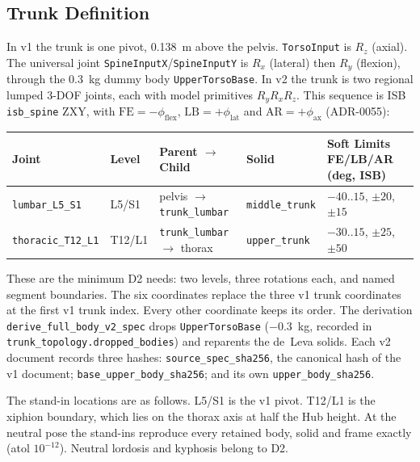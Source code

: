 \documentclass[11pt,a4paper]{article}
\begin{document}
\subsection{Trunk Definition}
In v1 the trunk is one pivot, 0.138~m above the pelvis.
\texttt{TorsoInput} is $R_z$ (axial). The universal joint
\texttt{SpineInputX}/\texttt{SpineInputY} is $R_x$ (lateral) then $R_y$
(flexion), through the 0.3~kg dummy body \texttt{UpperTorsoBase}. In v2 the
trunk is two regional lumped 3-DOF joints, each with model primitives
$R_y R_x R_z$. This sequence is ISB \texttt{isb\_spine} ZXY, with
$\mathrm{FE}=-\phi_{\mathrm{flex}}$, $\mathrm{LB}=+\phi_{\mathrm{lat}}$ and
$\mathrm{AR}=+\phi_{\mathrm{ax}}$ (ADR-0055):
\begin{center}
\begin{tabular}{lllll}
Joint & Level & Parent $\to$ Child & Solid & Soft Limits FE/LB/AR (deg, ISB) \\
\hline
\texttt{lumbar\_L5\_S1} & L5/S1 & pelvis $\to$ \texttt{trunk\_lumbar} &
\texttt{middle\_trunk} & $-40..15$, $\pm20$, $\pm15$ \\
\texttt{thoracic\_T12\_L1} & T12/L1 & \texttt{trunk\_lumbar} $\to$ thorax &
\texttt{upper\_trunk} & $-30..15$, $\pm25$, $\pm50$ \\
\end{tabular}
\end{center}
These are the minimum D2 needs: two levels, three rotations each, and named
segment boundaries. The six coordinates replace the three v1 trunk coordinates
at the first v1 trunk index. Every other coordinate keeps its order. The
derivation \texttt{derive\_full\_body\_v2\_spec} drops \texttt{UpperTorsoBase}
($-0.3$~kg, recorded in \texttt{trunk\_topology.dropped\_bodies}) and
reparents the de~Leva solids. Each v2 document records three hashes:
\texttt{source\_spec\_sha256}, the canonical hash of the v1 document;
\texttt{base\_upper\_body\_sha256}; and its own \texttt{upper\_body\_sha256}.

The stand-in locations are as follows. L5/S1 is the v1 pivot. T12/L1 is the
xiphion boundary, which lies on the thorax axis at half the Hub height. At the
neutral pose the stand-ins reproduce every retained body, solid and frame
exactly (atol $10^{-12}$). Neutral lordosis and kyphosis belong to D2.
\end{document}
